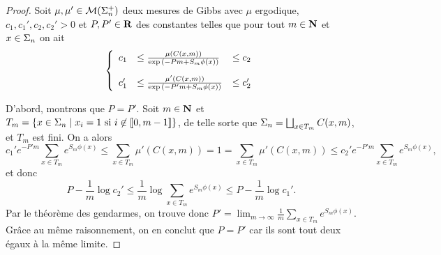   \begin{proof}
    Soit $\mu, \mu' \in \mathcal{M} (\Sigma_{n}^+)$ deux mesures de Gibbs avec $\mu$ ergodique, $c_1, c_1', c_2, c_2' > 0$ et $P, P' \in \mathbf R$
    des constantes telles que pour tout $m \in \mathbf N$ et $x \in \Sigma_n$ on ait
    $$\left\{\begin{array}{lll}
	c_1  &\leq \frac{\mu(C(x,m))}{\exp{(-Pm + S_m\phi(x))}} &\leq c_2 \vspace{1em} \\
	c_1' &\leq \frac{\mu'(C(x,m))}{\exp{(-P'm + S_m\phi(x))}} &\leq c_2'
      \end{array}\right.$$

      D'abord, montrons que $P = P'$.
      Soit $m \in \mathbf N$ et $T_m = \left\{x \in \Sigma_n \mid x_i = 1 \text{ si } i \not\in [\![ 0, m-1 ]\!] \right\}$,
      de telle sorte que $\Sigma_n = \bigsqcup_{x\in T_m}{C(x,m)}$, et $T_m$ est fini.
      On a alors
      $$c_1'e^{-P'm}\sum_{x\in T_m}{e^{S_m\phi(x)}} \leq \sum_{x\in T_m}{\mu'(C(x,m))}
            = 1 = \sum_{x\in T_m}{\mu'(C(x, m))} \leq c_2'e^{-P'm}\sum_{x\in T_m}{e^{S_m\phi(x)}},$$
      et donc
      $$P - \frac 1 m \log{c_2'} \leq \frac 1 m \log{\sum_{x\in T_m}{e^{S_m\phi(x)}}} \leq P - \frac 1 m \log{c_1'}.$$
      Par le théorème des gendarmes, on trouve donc $P' = \lim_{m\to\infty}{\frac 1 m\sum_{x\in T_m}{e^{S_m\phi(x)}}}$.
      Grâce au même raisonnement, on en conclut que $P = P'$ car ils sont tout deux égaux à la même limite.


\end{proof}
